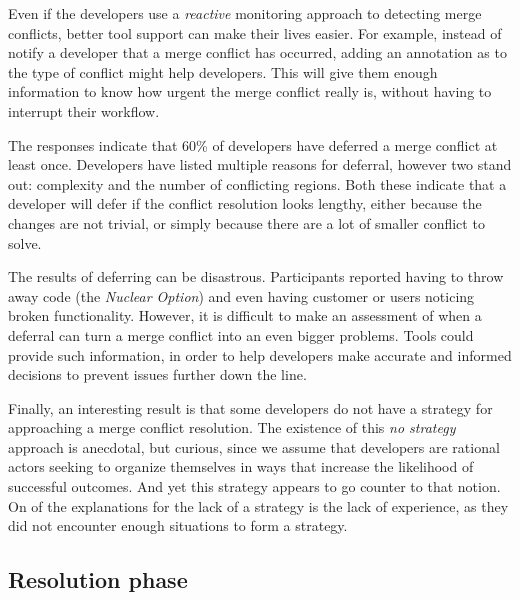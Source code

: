 Even if the developers use a \emph{reactive} monitoring approach to detecting merge conflicts, better tool support can make their lives easier.
For example, instead of notify a developer that a merge conflict has occurred, adding an annotation as to the type of conflict might help developers.
This will give them enough information to know how urgent the merge conflict really is, without having to interrupt their workflow.

The responses indicate that 60\% of developers have deferred a merge conflict at least once. 
Developers have listed multiple reasons for deferral, however two stand out: complexity and the number of conflicting regions.
Both these indicate that a developer will defer if the conflict resolution looks lengthy, either because the changes are not trivial, or simply because there are a lot of smaller conflict to solve.

The results of deferring can be disastrous. 
Participants reported having to throw away code (the \emph{Nuclear Option}) and even having customer or users noticing broken functionality.
However, it is difficult to make an assessment of when a deferral can turn a merge conflict into an even bigger problems.
Tools could provide such information, in order to help developers make accurate and informed decisions to prevent issues further down the line.

Finally, an interesting result is that some developers do not have a strategy for approaching a merge conflict resolution.
The existence of this \textit{no strategy} approach is anecdotal, but curious, since we assume that developers are rational actors seeking to organize themselves in ways that increase the likelihood of successful outcomes.
And yet this strategy appears to go counter to that notion.
On of the explanations for the lack of a strategy is the lack of experience, as they did not encounter enough situations to form a strategy.
\subsection{Resolution phase}

